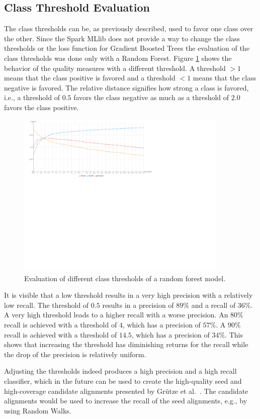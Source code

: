 \subsection{Class Threshold Evaluation}
The class thresholds can be, as previously described, used to favor one class over the other. Since the Spark MLlib does not provide a way to change the class thresholds or the loss function for Gradient Boosted Trees the evaluation of the class thresholds was done only with a Random Forest. Figure \ref{rf_thresh_large} shows the behavior of the quality measures with a different threshold. A threshold $> 1$ means that the class positive is favored and a threshold $< 1$ means that the class negative is favored. The relative distance signifies how strong a class is favored, i.e., a threshold of $0.5$ favors the class negative as much as a threshold of $2.0$ favors the class positive.\par
\begin{figure}[H]
	\centering
	\includegraphics[width=0.9\textwidth]{img/rf_thresh_large}
	\caption{Evaluation of different class thresholds of a random forest model.}
	\label{rf_thresh_large}
\end{figure}
It is visible that a low threshold results in a very high precision with a relatively low recall. The threshold of $0.5$ results in a precision of $89\%$ and a recall of $36\%$. A very high threshold leads to a higher recall with a worse precision. An $80\%$ recall is achieved with a threshold of $4$, which has a precision of $57\%$. A $90\%$ recall is achieved with a threshold of $14.5$, which has a precision of $34\%$. This shows that increasing the threshold has diminishing returns for the recall while the drop of the precision is relatively uniform.\par
Adjusting the thresholds indeed produces a high precision and a high recall classifier, which in the future can be used to create the high-quality seed and high-coverage candidate alignments presented by Grütze et al.\ \cite{coheel}. The candidate alignments would be used to increase the recall of the seed alignments, e.g., by using Random Walks.\par

